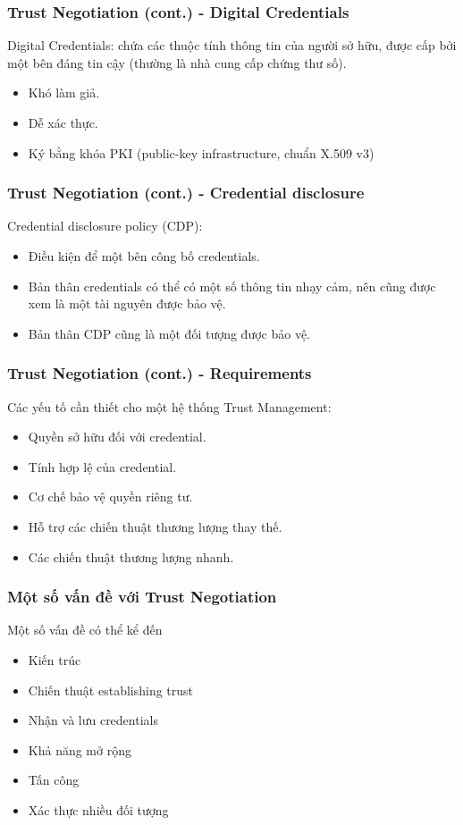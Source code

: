 \documentclass[11pt]{beamer}
\newcommand{\eg}{\text{e.g.\ }}
\begin{document}
\begin{frame}
\frametitle{Trust Negotiation (cont.) - Digital Credentials}
Digital Credentials: chứa các thuộc tính thông tin của người sở hữu, được cấp bởi một bên đáng tin cậy (thường là nhà cung cấp chứng thư số).
\begin{itemize}
\item Khó làm giả.
\item Dễ xác thực.
\item Ký bằng khóa PKI (public-key infrastructure, \eg chuẩn X.509 v3)
\end{itemize}
\end{frame}

\begin{frame}
\frametitle{Trust Negotiation (cont.) - Credential disclosure}
Credential disclosure policy (CDP):
\begin{itemize}
\item Điều kiện để một bên công bố credentials.
\item Bản thân credentials có thể có một số thông tin nhạy cảm, nên cũng được xem là một tài nguyên được bảo vệ.
\item Bản thân CDP cũng là một đối tượng được bảo vệ.
\end{itemize}
\end{frame}

\begin{frame}
\frametitle{Trust Negotiation (cont.) - Requirements}
Các yếu tố cần thiết cho một hệ thống Trust Management:
\begin{itemize}
\item Quyền sở hữu đối với credential.
\item Tính hợp lệ của credential.
\item Cơ chế bảo vệ quyền riêng tư.
\item Hỗ trợ các chiến thuật thương lượng thay thế.
\item Các chiến thuật thương lượng nhanh.
\end{itemize}
\end{frame}

\begin{frame}
\frametitle{Một số vấn đề với Trust Negotiation}
Một số vấn đề có thể kể đến\cite{10.1007/3-540-44875-6_20}
\begin{itemize}
\item Kiến trúc%
\item Chiến thuật establishing trust
\item Nhận và lưu credentials
\item Khả năng mở rộng
\item Tấn công
\item Xác thực nhiều đối tượng
\end{itemize}
\end{frame}
\end{document}
